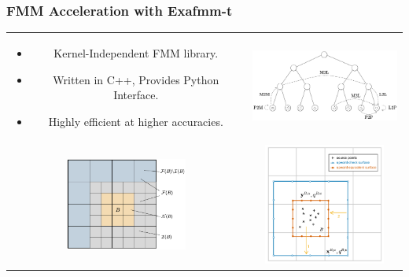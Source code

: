 \documentclass[dvipsnames,10pt]{beamer}
\begin{document}
\begin{frame}
	\frametitle{FMM Acceleration with Exafmm-t}
	\vspace{-.1cm}
	\begin{center}
		\begin{tabular}{cc}
			\begin{minipage}{5cm}
				\begin{itemize}
					\item Kernel-Independent FMM library.
					\item Written in C++, Provides Python Interface.
					\item Highly efficient at higher accuracies.
				\end{itemize}
			\end{minipage} &
			\includegraphics[width=5cm]{../figs/fmm_sketch.pdf} \\
			\includegraphics[width=4cm]{../figs/near_far_decomposition.pdf} &
			\includegraphics[width=4cm]{../figs/multipole_expansion.pdf}
		\end{tabular}
	\end{center}
	
\end{frame}
\end{document}
